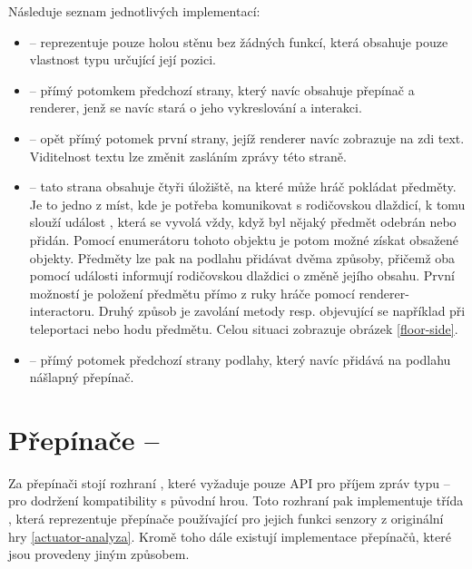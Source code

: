 Následuje seznam jednotlivých implementací:
\begin{itemize}

\item {} -- reprezentuje pouze holou stěnu bez žádných funkcí, která obsahuje
	pouze vlastnost typu  určující její pozici. 

\item {} -- přímý potomkem předchozí strany, který navíc obsahuje přepínač a renderer, 
	jenž se navíc stará o jeho vykreslování a interakci. 

\item {} -- opět přímý potomek první strany, jejíž renderer navíc zobrazuje na zdi text. Viditelnost textu lze změnit zasláním zprávy
	této straně. 

\item {} -- tato strana obsahuje čtyři úložiště,
na které může hráč pokládat předměty. Je to jedno z míst, kde je potřeba komunikovat s rodičovskou dlaždicí, k tomu
slouží událost , která se vyvolá vždy, když byl nějaký předmět odebrán nebo přidán.
Pomocí enumerátoru tohoto objektu je potom možné získat obsažené objekty. Předměty lze pak na podlahu přidávat dvěma 
způsoby, přičemž oba pomocí události informují rodičovskou dlaždici o změně jejího obsahu. První možností je položení 
předmětu přímo z ruky hráče pomocí renderer-interactoru. Druhý způsob je zavolání metody  resp.  
objevující se například při teleportaci nebo hodu předmětu. Celou situaci zobrazuje obrázek \ref{floor-side}.

\item {} -- přímý potomek předchozí strany podlahy, který navíc přidává na podlahu nášlapný přepínač.

\end{itemize}


\section{Přepínače -- }\label{actuators-implementation}

Za přepínači stojí rozhraní , které vyžaduje pouze API pro příjem zpráv typu  -- pro dodržení
kompatibility s původní hrou. Toto rozhraní pak implementuje třída , která reprezentuje přepínače používající 
pro jejich funkci senzory z originální hry \vref{actuator-analyza}. Kromě toho dále existují implementace přepínačů, které jsou provedeny
jiným způsobem.

